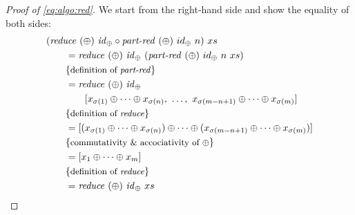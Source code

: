 \begin{proof}[Proof of \autoref{eq:algo:red}]
  We start from the right-hand side and show the equality of both sides:
  \begin{align*}
    &(\reduce\ (\oplus)\ \id_\oplus \circ \partRed\ (\oplus)\ id_\oplus\ n)\ xs\\
    &\qquad = \reduce\ (\oplus)\ \id_\oplus\ (\partRed\ (\oplus)\ id_\oplus\ n\ xs)\\
    &\qquad \comment{definition of \partRed}\\
    &\qquad = \reduce\ (\oplus)\ \id_\oplus\\
    &\qquad\qquad [x_{\sigma(1)} \oplus \dots \oplus x_{\sigma(n)},\ \dots ,\ x_{\sigma(m-n+1)} \oplus \dots \oplus x_{\sigma(m)}]\\
    &\qquad \comment{definition of \reduce}\\
    &\qquad = [(x_{\sigma(1)} \oplus \dots \oplus x_{\sigma(n)}) \oplus \dots \oplus (x_{\sigma(m-n+1)} \oplus \dots \oplus x_{\sigma(m)})]\\
    &\qquad \comment{commutativity \& accociativity of $\oplus$}\\
    &\qquad = [x_1 \oplus \dots \oplus x_m]\\
    &\qquad \comment{definition of \reduce}\\
    &\qquad = \reduce\ (\oplus)\ \id_\oplus\ xs
  \end{align*}
\end{proof}

